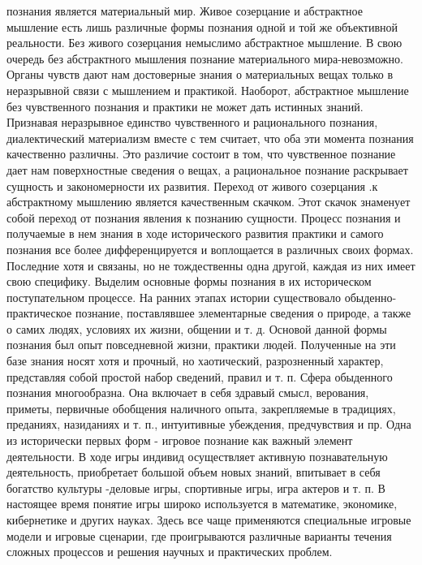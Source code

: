 \documentclass[12pt]{article}
\begin{document}
познания является материальный мир. Живое созерцание и абстрактное мышление есть лишь различные формы
познания одной и той же объективной реальности.
Без  живого  созерцания  немыслимо  абстрактное  мышление.  В  свою  очередь  без  абстрактного  мышления
познание  материального  мира-невозможно.  Органы  чувств  дают  нам  достоверные  знания  о  материальных
вещах  только  в  неразрывной  связи  с  мышлением  и  практикой.  Наоборот,  абстрактное  мышление  без
чувственного познания и практики не может дать истинных знаний.
Признавая неразрывное единство чувственного и рационального познания, диалектический материализм вместе
с  тем  считает,  что  оба  эти  момента  познания  качественно  различны.  Это  различие  состоит  в  том,  что
чувственное  познание  дает  нам  поверхностные  сведения  о  вещах,  а  рациональное  познание  раскрывает
сущность и закономерности их развития. Переход от живого созерцания .к абстрактному мышлению является
качественным скачком. Этот скачок знаменует собой переход от познания явления к познанию сущности.
Процесс познания и получаемые в нем знания в ходе исторического развития практики и самого познания все
более  дифференцируется  и  воплощается  в  различных  своих  формах.  Последние  хотя  и  связаны,  но  не
тождественны одна другой, каждая из них имеет свою специфику. Выделим основные формы познания в их
историческом поступательном процессе.
На  ранних  этапах  истории  существовало  обыденно-практическое  познание,  поставлявшее  элементарные
сведения о природе, а также о самих людях, условиях их жизни, общении и т. д. Основой данной формы
познания  был  опыт  повседневной  жизни,  практики  людей.  Полученные  на  эти  базе  знания  носят  хотя  и
прочный, но хаотический, разрозненный характер, представляя собой простой набор сведений, правил и т. п.
Сфера  обыденного  познания  многообразна.  Она  включает  в  себя  здравый  смысл,  верования,  приметы,
первичные  обобщения  наличного  опыта,  закрепляемые  в  традициях,  преданиях,  назиданиях  и  т.  п.,
интуитивные убеждения, предчувствия и пр.
Одна из исторически первых форм - игровое познание как важный элемент деятельности. В ходе игры индивид
осуществляет активную познавательную деятельность, приобретает большой объем новых знаний, впитывает в
себя богатство культуры -деловые игры, спортивные игры, игра актеров и т. п.
В настоящее время понятие игры широко используется в математике, экономике, кибернетике и других науках.
Здесь все чаще применяются специальные игровые модели и игровые сценарии, где проигрываются различные
варианты течения сложных процессов и решения научных и практических проблем.
\end{document}
